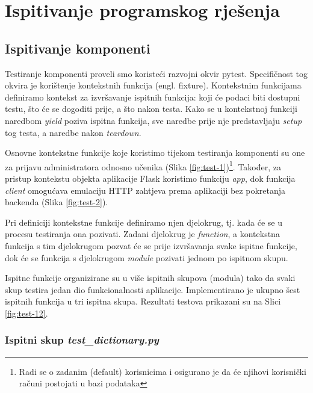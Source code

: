 	
		\section{Ispitivanje programskog rješenja}
	
			
			\subsection{Ispitivanje komponenti}

Testiranje komponenti proveli smo koristeći razvojni okvir pytest. Specifičnost tog okvira je korištenje kontekstnih funkcija (engl. fixture). Kontekstnim funkcijama definiramo kontekst za izvršavanje ispitnih funkcija: koji će podaci biti dostupni testu, što će se dogoditi prije, a što nakon testa. Kako se u kontekstnoj funkciji naredbom \emph{yield} poziva ispitna funkcija, sve naredbe prije nje predstavljaju \emph{setup} tog testa, a naredbe nakon \emph{teardown}. 

Osnovne kontekstne funkcije koje koristimo tijekom testiranja komponenti su one za prijavu administratora odnosno učenika (Slika \ref{fig:test-1})\footnote{Radi se o zadanim (default) korisnicima i osigurano je da će njihovi korisnički računi postojati u bazi podataka}. Također, za pristup kontekstu objekta aplikacije Flask koristimo funkciju \emph{app}, dok  funkcija \emph{client} omogućava emulaciju HTTP zahtjeva prema aplikaciji bez pokretanja backenda (Slika \ref{fig:test-2}).

Pri definiciji kontekstne funkcije definiramo njen djelokrug, tj. kada će se u procesu testiranja ona pozivati. Zadani djelokrug je \emph{function}, a kontekstna funkcija s tim djelokrugom pozvat će se prije izvršavanja svake ispitne funkcije, dok će se funkcija s djelokrugom \emph{module} pozivati jednom po ispitnom skupu.

Ispitne funkcije organizirane su u više ispitnih skupova (modula) tako da svaki skup testira jedan dio funkcionalnosti aplikacije. Implementirano je ukupno šest ispitnih funkcija u tri ispitna skupa. Rezultati testova prikazani su na Slici \ref{fig:test-12}.


\subsubsection{Ispitni skup \emph{test\_dictionary.py}}

